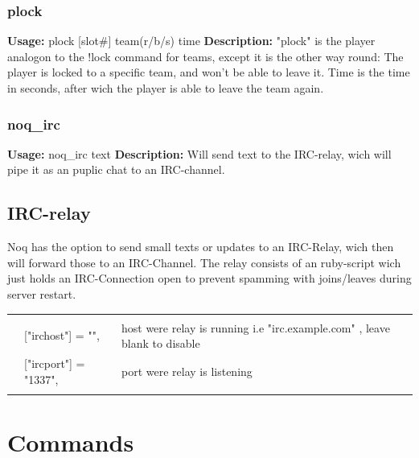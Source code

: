 \documentclass[12pt,a4paper]{article}
\begin{document}
\subsubsection{plock}
\textbf{Usage:} \hfill plock [slot\#] team(r/b/s) time \linebreak
\textbf{Description:} \linebreak
"plock" is the player analogon to the !lock command for teams, except it is the other way round:
The player is locked to a specific team, and won't be able to leave it.
Time is the time in seconds, after wich the player is able to leave the team again.

\subsubsection{noq_irc}
\textbf{Usage:} \hfill noq_irc text\linebreak
\textbf{Description:} \linebreak
Will send text to the IRC-relay, wich will pipe it as an puplic chat to an IRC-channel.

\subsection{IRC-relay}
Noq has the option to send small texts or updates to an IRC-Relay, wich then will forward those to an IRC-Channel.
The relay consists of an ruby-script wich just holds an IRC-Connection open to prevent spamming with joins/leaves during server restart.

\begin{tabular}{l l|l}
\hline & & \\
 & 	["irchost"] = "",  & host were relay is running i.e "irc.example.com" , leave blank to disable\\
 &	["ircport"] = "1337", &  port were relay is listening\\
 & & \\
 \hline
\end{tabular}

\section{Commands}

\newcommand{\inclkwcmds}{ }
\newcommand{\inclkwadmins}{ }

\ifthenelse{\boolean{onKW}}{\inclkwcmds}{}
\ifthenelse{\boolean{onKW}}{\inclkwadmins}{}
\end{document}
